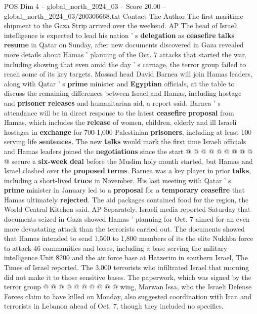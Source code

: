 \begin{textsample}{POS Dim 4 – global\_north\_2024\_03 – Score 20.00 – global\_north\_2024\_03/200306668.txt}  \label{ex:f4_pos_243}
Contact The Author The first maritime shipment to the Gaza Strip arrived over the weekend.
AP The head of Israeli intelligence is expected to lead his nation ' s \textbf{delegation} as \textbf{ceasefire} \textbf{talks} \textbf{resume} in Qatar on Sunday, after new documents discovered in Gaza revealed more details about Hamas ' planning of the Oct. 7 attacks that started the war, including showing that even amid the day ' s carnage, the terror group failed to reach some of its key targets.
Mossad head David Barnea will join Hamas leaders, along with Qatar ' s \textbf{prime} minister and \textbf{Egyptian} officials, at the table to discuss the remaining differences between Israel and Hamas, including hostage and \textbf{prisoner} \textbf{releases} and humanitarian aid, a report said.
Barnea ' s attendance will be in direct response to the latest \textbf{ceasefire} \textbf{proposal} from Hamas, which includes the \textbf{release} of women, children, elderly and ill Israeli hostages in \textbf{exchange} for 700-1,000 Palestinian \textbf{prisoners}, including at least 100 serving life \textbf{sentences}.
The new \textbf{talks} would mark the first time Israeli officials and Hamas leaders joined the \textbf{negotiations} since the start @ @ @ @ @ @ @ @ @ @ secure a \textbf{six-week} \textbf{deal} before the Muslim holy month started, but Hamas and Israel clashed over the \textbf{proposed} \textbf{terms}.
Barnea was a key player in prior \textbf{talks}, including a short-lived \textbf{truce} in November.
His last meeting with Qatar ' s \textbf{prime} minister in January led to a \textbf{proposal} for a \textbf{temporary} \textbf{ceasefire} that Hamas ultimately \textbf{rejected}.
The aid packages contained food for the region, the World Central Kitchen said.
AP Separately, Israeli media reported Saturday that documents seized in Gaza showed Hamas ' planning for Oct. 7 aimed for an even more devastating attack than the terrorists carried out.
The documents showed that Hamas intended to send 1,500 to 1,800 members of its the elite Nukhba force to attack 46 communities and bases, including a base serving the military intelligence Unit 8200 and the air force base at Hatzerim in southern Israel, The Times of Israel reported.
The 3,000 terrorists who infiltrated Israel that morning did not make it to those sensitive bases.
The paperwork, which was signed by the terror group @ @ @ @ @ @ @ @ @ @ wing, Marwan Issa, who the Israeli Defense Forces claim to have killed on Monday, also suggested coordination with Iran and terrorists in Lebanon ahead of Oct. 7, though they included no specifics.

\end{textsample}
